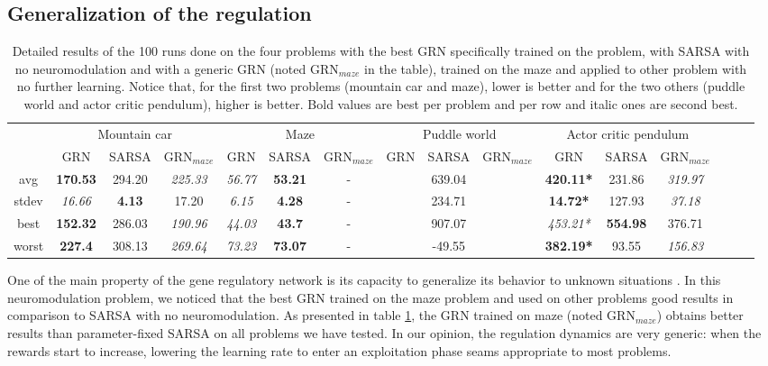 \subsection{Generalization of the regulation}
\begin{table}[t!]
\center
\setlength{\tabcolsep}{1mm}
\begin{tabular}{|c|ccc|ccc|ccc|ccc|ccc|}
\cline{2-13}
\multicolumn{1}{c}{ }	& \multicolumn{3}{|c}{Mountain car}	& \multicolumn{3}{|c}{Maze}	 & \multicolumn{3}{|c}{Puddle world}	& \multicolumn{3}{|c|}{Actor critic pendulum} \\
\multicolumn{1}{c|}{ }	
		& GRN	& SARSA	& GRN$_{maze}$			& GRN			& SARSA			& GRN$_{maze}$	& GRN	& SARSA	& GRN$_{maze}$	& GRN	& SARSA	& GRN$_{maze}$ 	\\\hline
avg		& \textbf{170.53}	& 294.20	& \emph{225.33}	& \emph{56.77}	& \textbf{53.21}	& 	-	& 		& 639.04	&		& \textbf{420.11*}	& 231.86	& \emph{319.97} \\
stdev	& \emph{16.66}	& \textbf{4.13}	& 17.20	& \emph{6.15}	& \textbf{4.28}	& 	-	&		& 234.71	&		& \textbf{14.72*}	& 127.93	& \emph{37.18} \\
best		& \textbf{152.32}	& 286.03	& \emph{190.96}	& \emph{44.03}	& \textbf{43.7}	& 	-	&		& 907.07	&		& \emph{453.21*}	& \textbf{554.98}	& 376.71 \\
worst	&\textbf{ 227.4}	& 308.13	& \emph{269.64}	& \emph{73.23}	& \textbf{73.07}	& 	-	&		& -49.55	&		& \textbf{382.19*}	& 93.55	& \emph{156.83} \\\hline
\end{tabular}
\caption{Detailed results of the 100 runs done on the four problems with the best GRN specifically trained on the problem, with SARSA with no neuromodulation and with a generic GRN (noted GRN$_{maze}$ in the table), trained on the maze and applied to other problem  with no further learning. Notice that, for the first two problems (mountain car and maze), lower is better and for the two others (puddle world and actor critic pendulum), higher is better. Bold values are best per problem and per row and italic ones are second best.}\label{tab:results}
\end{table}

One of the main property of the gene regulatory network is its capacity to generalize its behavior to unknown situations \cite{sanchez2014gene}. In this neuromodulation problem, we noticed that the best GRN trained on the maze problem and used on other problems good results in comparison to SARSA with no neuromodulation. As presented in table \ref{tab:results}, the GRN trained on maze (noted GRN$_{maze}$) obtains better results than parameter-fixed SARSA on all problems we have tested. In our opinion, the regulation dynamics are very generic: when the rewards start to increase, lowering the learning rate to enter an exploitation phase seams appropriate to most problems.

